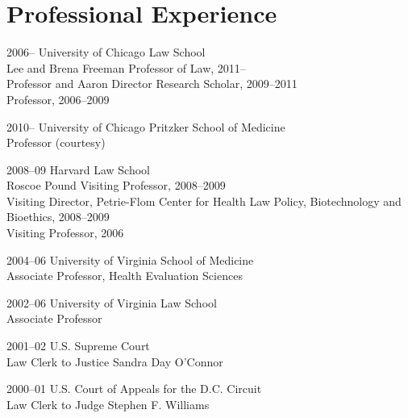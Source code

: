 \documentclass[11pt,letterpaper]{report}
\begin{document}

    \section*{Professional Experience}
    
    \begin{tablist}
    
        \item[2006--]   \tab{}University of Chicago Law School \\
                              Lee and Brena Freeman Professor of Law, 2011--\\
                              Professor and Aaron Director Research Scholar, 2009--2011 \\
                              Professor, 2006--2009
    
        \item[2010--]   \tab{}University of Chicago Pritzker School of Medicine \\
                              Professor (courtesy)
    
        \item[2008--09] \tab{}Harvard Law School \\
                              Roscoe Pound Visiting Professor, 2008--2009\\
                              Visiting Director, Petrie-Flom Center for Health Law Policy, Biotechnology and Bioethics, 2008--2009 \\
                              Visiting Professor, 2006
    
        \item[2004--06] \tab{}University of Virginia School of Medicine \\
                              Associate Professor, Health Evaluation Sciences
    
        \item[2002--06] \tab{}University of Virginia Law School \\
                              Associate Professor
    
        \item[2001--02] \tab{}U.S. Supreme Court \\
                              Law Clerk to Justice Sandra Day O'Connor
    
        \item[2000--01] \tab{}U.S. Court of Appeals for the D.C. Circuit \\
                              Law Clerk to Judge Stephen F. Williams
    
    \end{tablist}
\end{document}
